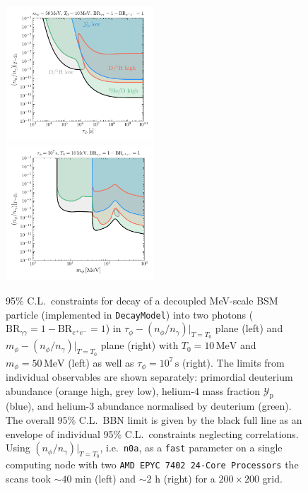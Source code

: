 \documentclass[11pt,a4paper]{article}
\begin{document}
\begin{figure}
	\centering
	\includegraphics[width=0.495\textwidth]{plots/decay_aa_50MeV.pdf}
	\includegraphics[width=0.495\textwidth]{plots/decay_aa_1e7s.pdf}
	\caption{95\% C.L.\ constraints for decay of a decoupled MeV-scale BSM particle (implemented in \texttt{DecayModel}) into two photons ($\text{BR}_{\gamma \gamma} = 1 - \text{BR}_{e^+ e^-} = 1$) in $\tau_\phi - (n_\phi/n_\gamma)|_{T=T_0}$ plane (left) and $m_\phi - (n_\phi/n_\gamma)|_{T=T_0}$ plane (right) with $T_0 = 10 \, \mathrm{MeV}$ and $m_\phi = 50 \, \mathrm{MeV}$ (left) as well as $\tau_\phi = 10^7 \, \mathrm{s}$ (right). The limits from individual observables are shown separately: primordial deuterium abundance (orange high, grey low), helium-4 mass fraction $\mathcal{Y}_\text{p}$ (blue), and helium-3 abundance normalised by deuterium (green). The overall 95\% C.L.\ BBN limit is given by the black full line as an envelope of individual 95\% C.L.\ constraints neglecting correlations. Using $(n_\phi/n_\gamma)|_{T=T_0}$, i.e.\ \texttt{n0a}, as a \texttt{fast} parameter on a single computing node with two \texttt{AMD EPYC 7402 24-Core Processors} the scans took $\sim 40$ min (left) and $\sim 2$ h (right) for a $200 \times 200$ grid.}
	\label{fig:scan_decay}
\end{figure}
\end{document}
